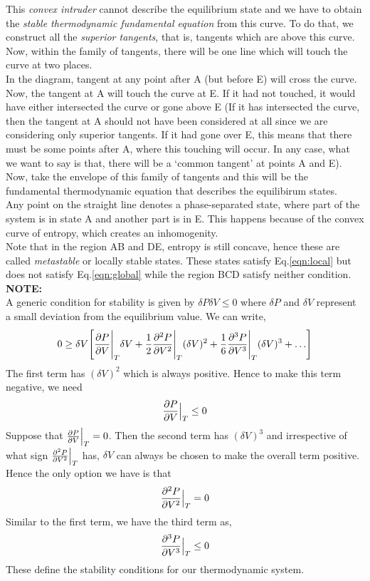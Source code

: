 \begin{figure}[H]
    \centering 
    
\end{figure}
\noindent
This \textit{convex intruder} cannot describe the equilibrium state and we have to obtain the \textit{stable thermodynamic fundamental equation} from this curve. To do that, we construct all the \textit{superior tangents}, that is, tangents which are above this curve. Now, within the family of tangents, there will be one line which will touch the curve at two places.\\[0.2cm] In the diagram, tangent at any point after A (but before E) will cross the curve. Now, the tangent at A will touch the curve at E. If it had not touched, it would have either intersected the curve or gone above E (If it has intersected the curve, then the tangent at A should not have been considered at all since we are considering only superior tangents. If it had gone over E, this means that there must be some points after A, where this touching will occur. In any case, what we want to say is that, there will be a `common tangent' at points A and E). \\[0.2cm]
Now, take the envelope of this family of tangents and this will be the fundamental thermodynamic equation that describes the equilibirum states.\\[0.2cm]
Any point on the straight line denotes a phase-separated state, where part of the system is in state A and another part is in E. This happens because of the convex curve of entropy, which creates an inhomogenity.  \\[0.2cm]
Note that in the region AB and DE, entropy is still concave, hence these are called \textit{metastable} or locally stable states. These states satisfy Eq.\eqref{eqn:local} but does not satisfy Eq.\eqref{eqn:global} while the region BCD satisfy neither condition.\\[0.2cm]
\textbf{NOTE:}\\[0.5cm]
A generic condition for stability is given by $\delta P\delta V \leq 0$ where $\delta P$ and $\delta V$ represent a small deviation from the equilibrium value. We can write,
\begin{align}\label{eqn:stability}
    0 \geq \delta V \qty[\pdv{P}{V}\Bigg|_T \delta V + \frac{1}{2}\pdv[2]{P}{V}\Bigg|_T (\delta V)^2+\frac{1}{6}\pdv[3]{P}{V}\Bigg|_T (\delta V)^3+\ldots]
\end{align}
The first term has $(\delta V)^2$ which is always positive. Hence to make this term negative, we need $$\pdv{P}{V}\Big|_T\leq 0$$ Suppose that $\pdv{P}{V}\Big|_T=0$. Then the second term has $(\delta V)^3$ and irrespective of what sign $\pdv[2]{P}{V}\Big|_T$ has, $\delta V$ can always be chosen to make the overall term positive. Hence the only option we have is that $$\pdv[2]{P}{V}\Big|_T=0$$ Similar to the first term, we have the third term as, $$\pdv[3]{P}{V}\Big|_T\leq 0$$ These define the stability conditions for our thermodynamic system. 
